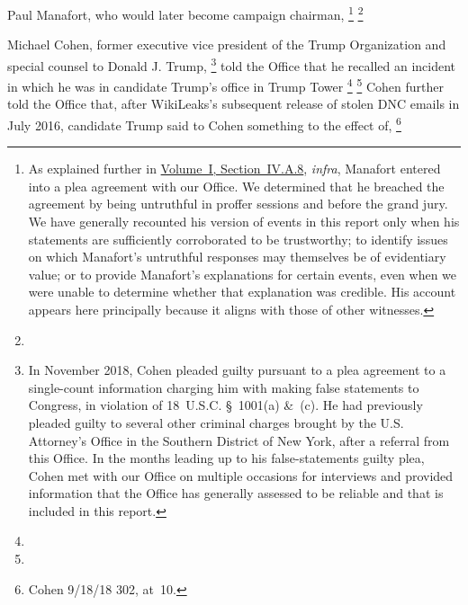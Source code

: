Paul Manafort, who would later become campaign chairman, %
\footnote{\label{fnOneNineSeven}As explained further in \hyperlink{subsubsection.1.4.1.8}{Volume~I, Section~IV.A.8}, \textit{infra}, Manafort entered into a plea agreement with our Office.
We determined that he breached the agreement by being untruthful in proffer sessions and before the grand jury.
We have generally recounted his version of events in this report only when his statements are sufficiently corroborated to be trustworthy;
to identify issues on which Manafort's untruthful responses may themselves be of evidentiary value;
or to provide Manafort's explanations for certain events, even when we were unable to determine whether that explanation was credible.
His account appears here principally because it aligns with those of other witnesses.}
\footnote{}

Michael Cohen, former executive vice president of the Trump Organization and special counsel to Donald J. Trump,%
\footnote{In November 2018, Cohen pleaded guilty pursuant to a plea agreement to a single-count information charging him with making false statements to Congress, in violation of 18~U.S.C. \S~1001(a) \&~(c).
He had previously pleaded guilty to several other criminal charges brought by the U.S. Attorney's Office in the Southern District of New York, after a referral from this Office.
In the months leading up to his false-statements guilty plea, Cohen met with our Office on multiple occasions for interviews and provided information that the Office has generally assessed to be reliable and that is included in this report.}
told the Office that he recalled an incident in which he was in candidate Trump's office in Trump Tower
\footnote{}
\footnote{}
Cohen further told the Office that, after WikiLeaks's subsequent release of stolen DNC emails in July 2016, candidate Trump said to Cohen something to the effect of, %
\footnote{Cohen 9/18/18 302, at~10.
  }

